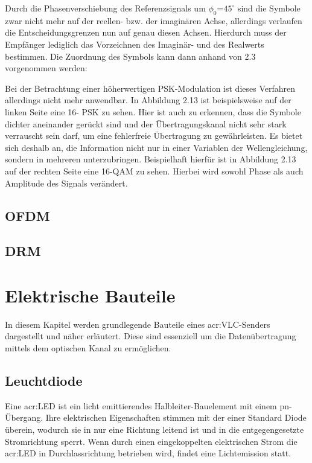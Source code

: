 Durch die Phasenverschiebung des Referenzsignals um $\phi_0$=$45^\circ$ sind die Symbole zwar
nicht mehr auf der reellen- bzw. der imaginären Achse, allerdings verlaufen die Entscheidungsgrenzen nun auf genau diesen Achsen. Hierdurch muss der Empfänger lediglich das Vorzeichnen des Imaginär- und des Realwerts bestimmen. Die Zuordnung des Symbols kann dann anhand von 2.3 vorgenommen werden:



Bei der Betrachtung einer höherwertigen PSK-Modulation ist dieses Verfahren allerdings
nicht mehr anwendbar. In Abbildung 2.13 ist beispielsweise auf der linken Seite eine 16-
PSK zu sehen. Hier ist auch zu erkennen, dass die Symbole dichter aneinander gerückt
sind und der Übertragungskanal nicht sehr stark verrauscht sein darf, um eine fehlerfreie
Übertragung zu gewährleisten. Es bietet sich deshalb an, die Information nicht nur in einer
Variablen der Wellengleichung, sondern in mehreren unterzubringen. Beispielhaft hierfür
ist in Abbildung 2.13 auf der rechten Seite eine 16-QAM zu sehen. Hierbei wird sowohl
Phase als auch Amplitude des Signals verändert.
\subsection{OFDM}
\label{subsec:Unterabschnitt1}



\subsection{DRM}
\label{subsec:Unterabschnitt1}



\section{Elektrische Bauteile}
\label{subsec:Unterabschnitt1}
In diesem Kapitel werden grundlegende Bauteile eines \gls{acr:VLC}-Senders dargestellt und näher erläutert. Diese sind essenziell um die Datenübertragung mittels dem optischen Kanal zu ermöglichen.

\subsection{Leuchtdiode}
\label{sub:led}


Eine \gls{acr:LED} ist ein licht emittierendes Halbleiter-Bauelement mit einem pn-Übergang. Ihre elektrischen Eigenschaften stimmen mit der einer Standard Diode überein, wodurch sie in nur eine Richtung leitend ist und in die entgegengesetzte Stromrichtung sperrt. Wenn durch einen eingekoppelten elektrischen Strom die \gls{acr:LED} in Durchlassrichtung betrieben wird, findet eine Lichtemission statt.\cite{slabke} 


